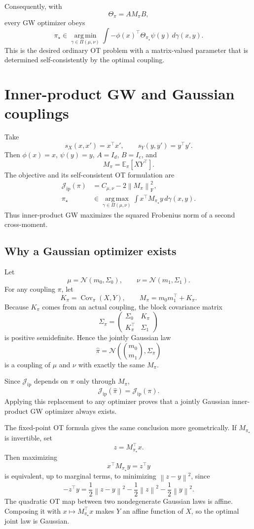 \documentclass[11pt]{article}
\newcommand{\E}{\mathbb{E}}
\newcommand{\cJ}{\mathcal{J}}
\newcommand{\PiCouplings}{\Pi}
\newcommand{\norm}[1]{\left\lVert #1\right\rVert}
\newcommand{\Cov}{\operatorname{Cov}}
\newcommand{\argmin}{\operatorname*{arg\,min}}
\newcommand{\argmax}{\operatorname*{arg\,max}}
\begin{document}
Consequently, with
\[
\Theta_\pi=A M_\pi B,
\]
every GW optimizer obeys
\[
\boxed{
\pi_\star\in
\argmin_{\gamma\in\PiCouplings(\mu,\nu)}
\int -\phi(x)^\top\Theta_{\pi_\star}\psi(y)\,d\gamma(x,y).
}
\]
This is the desired ordinary OT problem with a matrix-valued parameter
that is determined self-consistently by the optimal coupling.

\section{Inner-product GW and Gaussian couplings}

Take
\[
s_X(x,x')=x^\top x',
\qquad
s_Y(y,y')=y^\top y'.
\]
Then $\phi(x)=x$, $\psi(y)=y$, $A=I_d$, $B=I_e$, and
\[
M_\pi=\E_\pi[XY^\top].
\]
The objective and its self-consistent OT formulation are
\begin{align*}
\cJ_{\mathrm{ip}}(\pi)
&=C_{\mu,\nu}-2\norm{M_\pi}_{\mathrm F}^2,\\
\pi_\star
&\in
\argmax_{\gamma\in\PiCouplings(\mu,\nu)}
\int x^\top M_{\pi_\star}y\,d\gamma(x,y).
\end{align*}
Thus inner-product GW maximizes the squared Frobenius norm of a second
cross-moment.

\subsection{Why a Gaussian optimizer exists}

Let
\[
\mu=\mathcal N(m_0,\Sigma_0),
\qquad
\nu=\mathcal N(m_1,\Sigma_1).
\]
For any coupling $\pi$, let
\[
K_\pi=\Cov_\pi(X,Y),
\qquad
M_\pi=m_0m_1^\top+K_\pi.
\]
Because $K_\pi$ comes from an actual coupling, the block covariance matrix
\[
\Sigma_\pi=
\begin{pmatrix}
\Sigma_0 & K_\pi\\
K_\pi^\top & \Sigma_1
\end{pmatrix}
\]
is positive semidefinite. Hence the jointly Gaussian law
\[
\widehat\pi
=
\mathcal N\!\left(
\binom{m_0}{m_1},
\Sigma_\pi
\right)
\]
is a coupling of $\mu$ and $\nu$ with exactly the same $M_\pi$.

Since $\cJ_{\mathrm{ip}}$ depends on $\pi$ only through $M_\pi$,
\[
\cJ_{\mathrm{ip}}(\widehat\pi)
=
\cJ_{\mathrm{ip}}(\pi).
\]
Applying this replacement to any optimizer proves that a jointly Gaussian
inner-product GW optimizer always exists.

The fixed-point OT formula gives the same conclusion more geometrically.
If $M_{\pi_\star}$ is invertible, set
\[
z=M_{\pi_\star}^\top x.
\]
Then maximizing
\[
x^\top M_{\pi_\star}y=z^\top y
\]
is equivalent, up to marginal terms, to minimizing $\norm{z-y}^2$, since
\[
-z^\top y
=
\frac12\norm{z-y}^2
-\frac12\norm{z}^2
-\frac12\norm{y}^2.
\]
The quadratic OT map between two nondegenerate Gaussian laws is affine.
Composing it with $x\mapsto M_{\pi_\star}^\top x$ makes $Y$ an affine
function of $X$, so the optimal joint law is Gaussian.
\end{document}
